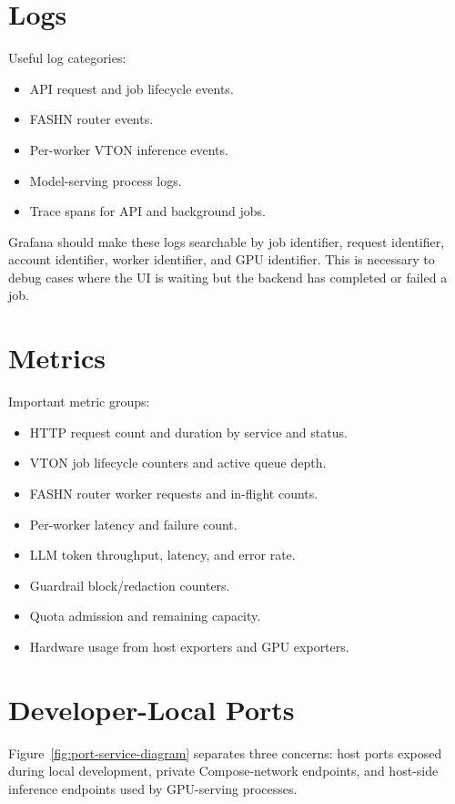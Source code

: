 \documentclass[12pt,a4paper,oneside]{report}
\begin{document}
\section{Logs}

Useful log categories:

\begin{itemize}
  \item API request and job lifecycle events.
  \item FASHN router events.
  \item Per-worker VTON inference events.
  \item Model-serving process logs.
  \item Trace spans for API and background jobs.
\end{itemize}

Grafana should make these logs searchable by job identifier, request identifier, account identifier, worker identifier, and GPU identifier. This is necessary to debug cases where the UI is waiting but the backend has completed or failed a job.

\section{Metrics}

Important metric groups:

\begin{itemize}
  \item HTTP request count and duration by service and status.
  \item VTON job lifecycle counters and active queue depth.
  \item FASHN router worker requests and in-flight counts.
  \item Per-worker latency and failure count.
  \item LLM token throughput, latency, and error rate.
  \item Guardrail block/redaction counters.
  \item Quota admission and remaining capacity.
  \item Hardware usage from host exporters and GPU exporters.
\end{itemize}

\section{Developer-Local Ports}

Figure~\ref{fig:port-service-diagram} separates three concerns: host ports exposed during local development, private Compose-network endpoints, and host-side inference endpoints used by GPU-serving processes.
\end{document}
